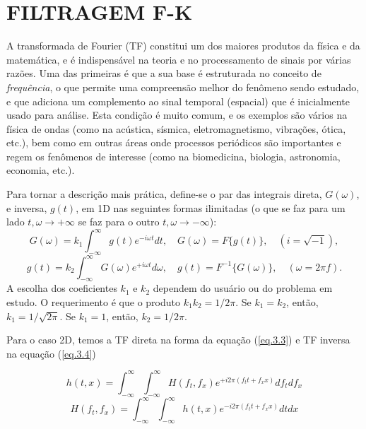 \chapter{FILTRAGEM F-K}
\label{cap3}

A transformada de Fourier (TF) constitui um dos maiores produtos da física e da matemática, e é indispensável na teoria e no processamento de sinais por várias razões. 
Uma das primeiras é que a sua base é estruturada no conceito de \textit{frequência}, o que permite uma compreensão melhor do fenômeno sendo estudado, e que adiciona um complemento ao sinal temporal (espacial) que é inicialmente usado para análise. 
Esta condição é muito comum, e os exemplos são vários na física de ondas (como na acústica, sísmica, eletromagnetismo, vibrações, ótica, etc.), bem como em outras áreas onde processos periódicos são importantes e regem os fenômenos de interesse (como na biomedicina, biologia, astronomia, economia, etc.). \cite{Lourenildo(2015)}

Para tornar a descrição mais prática, define-se o par das integrais direta, $G(\omega)$, e inversa, $g(t)$, em 1D nas seguintes formas ilimitadas (o que se faz para um lado $t,\omega \rightarrow +\infty$ se faz para o outro $t,\omega \rightarrow -\infty$):
\begin{equation}
G(\omega)=k_{1}\int_{-\infty}^{\infty}g(t)e^{-i\omega t}dt, \quad G(\omega)=F\{g(t)\}, \quad (i=\sqrt{-1}),
\label{eq.3.1}
\end{equation}
\begin{equation}
g(t)=k_{2}\int_{-\infty}^{\infty}G(\omega)e^{+i\omega t}d\omega, \quad g(t)=F^{-1}\{G(\omega)\}, \quad (\omega=2\pi f).
\label{eq.3.2}
\end{equation}
A escolha dos coeficientes $k_{1}$ e $k_{2}$ dependem do usuário ou do problema em estudo. O requerimento é que o produto $k_{1}k_{2}=1/2\pi$. Se $k_{1}=k_{2}$, então, $k_{1}=1/\sqrt{2\pi}$. Se $k_{1}=1$, então, $k_{2}=1/2\pi$.

Para o caso 2D, temos a TF direta na forma da equação (\ref{eq.3.3}) e TF inversa na equação (\ref{eq.3.4})

\begin{equation}
h(t, x)=\int_{-\infty}^{\infty} \int_{-\infty}^{\infty} H(f_{t}, f_{x}) e^{+i 2 \pi(f_{t} t+f_{x} x)} df_{t} df_{x}
\label{eq.3.3}
\end{equation}
\begin{equation}
H(f_{t}, f_{x})=\int_{-\infty}^{\infty} \int_{-\infty}^{\infty} h(t, x) e^{-i 2 \pi(f_{t} t+f_{x} x)} dt dx
\label{eq.3.4}
\end{equation}

